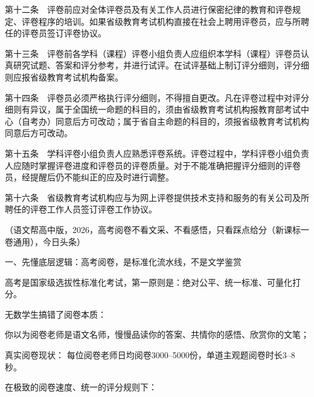 \documentclass[12pt,a4paper]{article}
\begin{document}
第十二条　评卷前应对全体评卷员及有关工作人员进行保密纪律的教育和评卷规定、评卷程序的培训。如果省级教育考试机构直接在社会上聘用评卷员，应与所聘任的评卷员签订评卷协议。



第十三条　评卷前各学科（课程）评卷小组负责人应组织本学科（课程）评卷员认真研究试题、答案和评分参考，并进行试评。在试评基础上制订评分细则，评分细则应报省级教育考试机构备案。



第十四条　评卷员必须严格执行评分细则，不得擅自更改。凡在评卷过程中对评分细则有异议，属于全国统一命题的科目的，须由省级教育考试机构报教育部考试中心（自考办）同意后方可改动；属于省自主命题的科目的，须报省级教育考试机构同意后方可改动。



第十五条　学科评卷小组负责人应熟悉评卷系统。评卷过程中，学科评卷小组负责人应随时掌握评卷进度和评卷员的评卷质量。对于不能准确把握评分细则的评卷员，经提醒后仍不能纠正的应及时进行调整。



第十六条　省级教育考试机构应与为网上评卷提供技术支持和服务的有关公司及所聘任的评卷工作人员签订评卷工作协议。









{\color{gray}\small （语文帮高中版，2026，高考阅卷不看文采、不看感悟，只看踩点给分（新课标一卷通用）}，今日头条）



一、先懂底层逻辑：高考阅卷，是标准化流水线，不是文学鉴赏





高考是国家级选拔性标准化考试，第一原则是：绝对公平、统一标准、可量化打分。





无数学生搞错了阅卷本质：



你以为阅卷老师是语文名师，慢慢品读你的答案、共情你的感悟、欣赏你的文笔；



真实阅卷现状： 每位阅卷老师日均阅卷3000–5000份，单道主观题阅卷时长3–8秒。





在极致的阅卷速度、统一的评分规则下：
\end{document}
